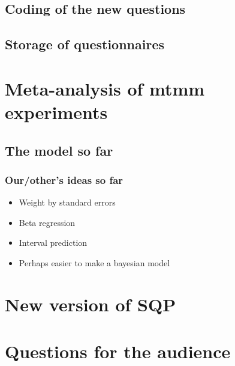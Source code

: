 \documentclass{beamer}
\begin{document}
\subsection{Coding of the new questions}
\subsection{Storage of questionnaires}

\section{Meta-analysis of mtmm experiments}

\subsection{The model so far}



\begin{frame}	
	\frametitle{Our/other's ideas so far}
\begin{itemize}
	\item Weight by standard errors
	\item Beta regression
	\item Interval prediction
	\item Perhaps easier to make a bayesian model
\end{itemize}

\end{frame}	

\section{New version of SQP}

% 

\section{Questions for the audience}


\begin{frame}
\end{frame}
\end{document}
